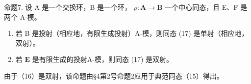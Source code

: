 命题7. 设 A 是一个交换环，B 是一个环， \(\rho: \mathbf{A} \to \mathbf{B}\) 一个中心同态，且 E、F 是两个 A-模。

\begin{enumerate}
\def\labelenumi{(\roman{enumi})}
\item
  若 B 是投射（相应地，有限生成投射）A-模，则同态 (17) 是单射（相应地，双射）。
\item
  若 \(\mathbf{E}\) 是有限生成的投射A-模，则同态 (17) 是双射。
\end{enumerate}

由于（16）是双射，该命题由§4第2号命题2应用于典范同态（15）得出。

